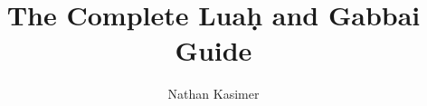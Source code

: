 \documentclass[11pt, openany]{book}
\begin{document}
	
	\title{The Complete Lua\d{h} and Gabbai Guide}
	
	\author{Nathan Kasimer}
	
	\maketitle
	
	\tableofcontents

			
	
	
	
	
	
	
	
\end{document}
